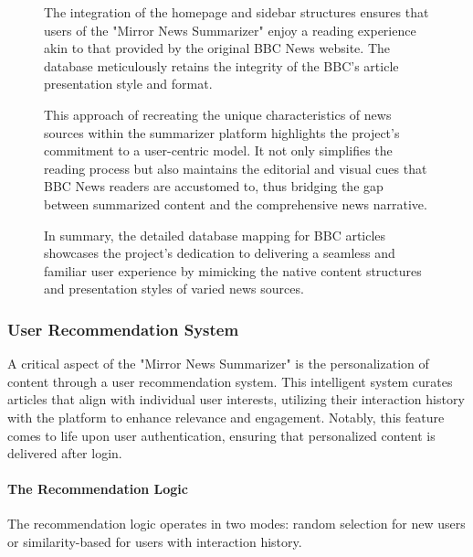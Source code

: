 \documentclass[10pt]{article}
\begin{document}
\begin{figure}[htbp]
\begin{minipage}[t]{0.5\textwidth}
        The integration of the homepage and sidebar structures ensures that users of the "Mirror News Summarizer" enjoy a reading experience akin to that provided by the original BBC News website. The database meticulously retains the integrity of the BBC's article presentation style and format.\newline

        This approach of recreating the unique characteristics of news sources within the summarizer platform highlights the project's commitment to a user-centric model. It not only simplifies the reading process but also maintains the editorial and visual cues that BBC News readers are accustomed to, thus bridging the gap between summarized content and the comprehensive news narrative.\newline

        In summary, the detailed database mapping for BBC articles showcases the project's dedication to delivering a seamless and familiar user experience by mimicking the native content structures and presentation styles of varied news sources.\newline
    \end{minipage}
\end{figure}

\newpage
\subsubsection{User Recommendation System}

A critical aspect of the "Mirror News Summarizer" is the personalization of content through a user recommendation system. This intelligent system curates articles that align with individual user interests, utilizing their interaction history with the platform to enhance relevance and engagement. Notably, this feature comes to life upon user authentication, ensuring that personalized content is delivered after login. 

\paragraph{The Recommendation Logic}
The recommendation logic operates in two modes: random selection for new users or similarity-based for users with interaction history. 
\end{document}
